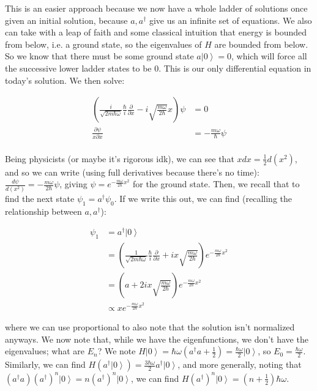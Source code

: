 \documentclass{report}
\newcommand{\ket}[1]{\left| #1 \right>} %
\begin{document}
This is an easier approach because we now have a whole ladder of solutions once given an initial solution, because $a, a^\dagger$ give us an infinite set of equations. We also can take with a leap of faith and some classical intuition that energy is bounded from below, i.e. a ground state, so the eigenvalues of $H$ are bounded from below. So we know that there must be some ground state $a\ket{0} = 0$, which will force all the successive lower ladder states to be $0$. This is our only differential equation in today's solution. We then solve:

\begin{align*}
\left(\frac{i}{\sqrt{2m\hbar\omega}}\frac{\hbar}{i}\frac{\partial}{\partial x} - i\sqrt{\frac{m\omega}{2\hbar}}x\right)\psi &= 0\\
\frac{\partial \psi}{x\partial x} &= -\frac{m\omega}{\hbar}\psi\\
\end{align*}

Being physicists (or maybe it's rigorous idk), we can see that $xdx = \frac{1}{2}d(x^2)$, and so we can write (using full derivatives because there's no time): $\frac{d\psi}{d(x^2)} = -\frac{m\omega}{2\hbar}\psi$, giving $\psi = e^{-\frac{m\omega}{2\hbar}x^2}$ for the ground state. Then, we recall that to find the next state $\psi_1 = a^\dagger\psi_0$. If we write this out, we can find (recalling the relationship between $a, a^\dagger$):

\begin{align*}
\psi_1 &= a^\dagger\ket{0}\\
&= \left(\frac{1}{\sqrt{2m\hbar\omega}}\frac{\hbar}{i}\frac{\partial}{\partial x} + ix\sqrt{\frac{m\omega}{2\hbar}}\right)e^{-\frac{m\omega}{2\hbar}x^2}\\
&= \left(a+2ix\sqrt{\frac{m\omega}{2\hbar}}\right)e^{-\frac{m\omega}{2\hbar}x^2}\\
&\propto xe^{-\frac{m\omega}{2\hbar}x^2}
\end{align*}

where we can use proportional to also note that the solution isn't normalized anyways. We now note that, while we have the eigenfunctions, we don't have the eigenvalues; what are $E_n$? We note $H\ket{0} = \hbar\omega\left(a^\dagger a + \frac{1}{2}\right) = \frac{\hbar\omega}{2}\ket{0}$, so $E_0 = \frac{\hbar\omega}{2}$. Similarly, we can find $H(a^\dagger\ket{0}) = \frac{3\hbar\omega}{2}a^\dagger\ket{0}$, and more generally, noting that $(a^\dagger a)(a^\dagger)^n\ket{0} = n(a^\dagger)^n\ket{0}$, we can find $H(a^\dagger)^n\ket{0} = \left(n + \frac{1}{2}\right)\hbar\omega$. 
\end{document}
